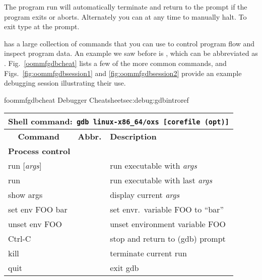 The program run will automatically terminate and return to the
 prompt if the program exits or aborts. Alternately you can
 at any time to manually halt. To exit  type
 at the  prompt.

 has a large collection of commands that you can use to control
program flow and inspect program data. An example we saw before is
, which can be abbreviated as
. Fig.~\ref{oommfgdbcheat} lists a few of the more common
commands, and Figs.~\ref{fig:oommfgdbsession1} and
\ref{fig:oommfgdbsession2} provide an example debugging session
illustrating their use.

\begin{codelisting}{f}{oommfgdbcheat}{ Debugger
    Cheatsheet\HTMLoutput{\phantom{\rule{1pt}{1.5\baselineskip}}}}{sec:debug:gdbintro}{ref}
\begin{center}\begin{tabular}{|l|l|l|}\hline
  \multicolumn{3}{|l|}{\rule[-1ex]{0pt}{3ex}\textbf{Shell%
   command:}\texttt{ gdb linux-x86\_64/oxs [corefile (opt)]}}\\\hline
  \multicolumn{1}{|c}{\rule[-1ex]{0pt}{3.5ex}
    \textbf{Command}}
  & \multicolumn{1}{|c}{\textbf{Abbr.}}
  & \multicolumn{1}{|l|}{\textbf{Description}}\\\hline
  \multicolumn{3}{|l|}{
  \rule{0pt}{2.5ex}\textcolor[rgb]{0,0.7,0}{\textbf{Process control}}}\\\hline
  run [\textit{args}] & & run executable with \textit{args}\\
  run & &  run executable with last \textit{args}\\
  show args & & display current \textit{args}\\
  set env FOO bar  & & set envr.\ variable FOO to ``bar''\\
  unset env FOO & & unset environment variable FOO\\
  Ctrl-C & & stop and return to (gdb) prompt\\
  kill & & terminate current run\\
  quit & & exit gdb\\[0.5ex]\hline


\end{tabular}
\end{center}
\end{codelisting}
